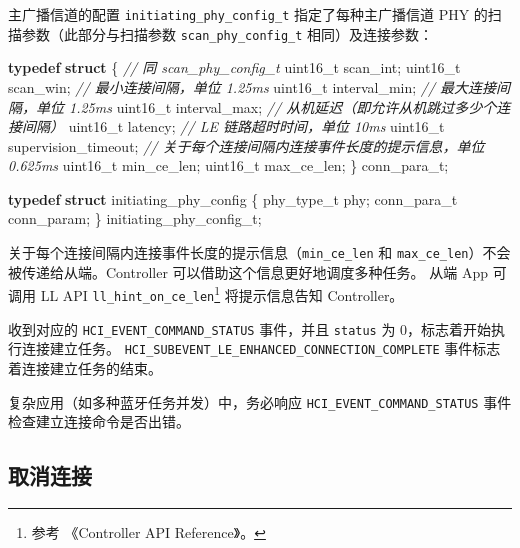 \documentclass[
  12pt,
]{book}
\makeatletter
\newenvironment{Shaded}{\begin{snugshade}}{\end{snugshade}}
\newcommand{\CommentTok}[1]{\textcolor[rgb]{0.56,0.35,0.01}{\textit{#1}}}
\newcommand{\DataTypeTok}[1]{\textcolor[rgb]{0.13,0.29,0.53}{#1}}
\newcommand{\KeywordTok}[1]{\textcolor[rgb]{0.13,0.29,0.53}{\textbf{#1}}}
\newcommand{\NormalTok}[1]{#1}
\newenvironment{kframe}{%
\medskip{}
\setlength{\fboxsep}{.8em}
 \def\at@end@of@kframe{}%
 \ifinner\ifhmode%
  \def\at@end@of@kframe{\end{minipage}}%
  \begin{minipage}{\columnwidth}%
 \fi\fi%
 \def\FrameCommand##1{\hskip\@totalleftmargin \hskip-\fboxsep
 \colorbox{shadecolor}{##1}\hskip-\fboxsep
     \hskip-\linewidth \hskip-\@totalleftmargin \hskip\columnwidth}%
 \MakeFramed {\advance\hsize-\width
   \@totalleftmargin\z@ \linewidth\hsize
   \@setminipage}}%
 {\par\unskip\endMakeFramed%
 \at@end@of@kframe}
\newenvironment{rmdblock}[1]
  {
  \begin{itemize}
  \renewcommand{\labelitemi}{
    \raisebox{-.7\height}[0pt][0pt]{
      {\setkeys{Gin}{width=3em,keepaspectratio}\texttt{[image: images/\#1]}}
    }
  }
  \setlength{\fboxsep}{1em}
  \begin{kframe}
  \item
  }
  {
  \end{kframe}
  \end{itemize}
  }
\newenvironment{rmdcaution}
  {\begin{rmdblock}{caution}}
  {\end{rmdblock}}
\makeatother
\begin{document}
主广播信道的配置 \texttt{initiating\_phy\_config\_t} 指定了每种主广播信道 PHY 的扫描参数（此部分与扫描参数 \texttt{scan\_phy\_config\_t} 相同）及连接参数：

\begin{Shaded}
\begin{Highlighting}[]
\KeywordTok{typedef} \KeywordTok{struct}\NormalTok{ \{}
    \CommentTok{// 同 scan_phy_config_t}
    \DataTypeTok{uint16_t}\NormalTok{ scan_int;}
    \DataTypeTok{uint16_t}\NormalTok{ scan_win;}
    \CommentTok{// 最小连接间隔，单位 1.25ms}
    \DataTypeTok{uint16_t}\NormalTok{ interval_min;}
    \CommentTok{// 最大连接间隔，单位 1.25ms}
    \DataTypeTok{uint16_t}\NormalTok{ interval_max;}
    \CommentTok{// 从机延迟（即允许从机跳过多少个连接间隔）}
    \DataTypeTok{uint16_t}\NormalTok{ latency;}
    \CommentTok{// LE 链路超时时间，单位 10ms}
    \DataTypeTok{uint16_t}\NormalTok{ supervision_timeout;}
    \CommentTok{// 关于每个连接间隔内连接事件长度的提示信息，单位 0.625ms}
    \DataTypeTok{uint16_t}\NormalTok{ min_ce_len;}
    \DataTypeTok{uint16_t}\NormalTok{ max_ce_len;}
\NormalTok{\} conn_para_t;}

\KeywordTok{typedef} \KeywordTok{struct}\NormalTok{ initiating_phy_config}
\NormalTok{\{}
\NormalTok{    phy_type_t phy;}
\NormalTok{    conn_para_t conn_param;}
\NormalTok{\} initiating_phy_config_t;}
\end{Highlighting}
\end{Shaded}

关于每个连接间隔内连接事件长度的提示信息（\texttt{min\_ce\_len} 和 \texttt{max\_ce\_len}）不会被传递给从端。Controller 可以借助这个信息更好地调度多种任务。
从端 App 可调用 LL API \texttt{ll\_hint\_on\_ce\_len}\footnote{参考 《Controller API Reference》。} 将提示信息告知 Controller。

收到对应的 \texttt{HCI\_EVENT\_COMMAND\_STATUS} 事件，并且 \texttt{status} 为 \(0\)，标志着开始执行连接建立任务。
\texttt{HCI\_SUBEVENT\_LE\_ENHANCED\_CONNECTION\_COMPLETE} 事件标志着连接建立任务的结束。

\begin{rmdcaution}
复杂应用（如多种蓝牙任务并发）中，务必响应
\texttt{HCI\_EVENT\_COMMAND\_STATUS} 事件检查建立连接命令是否出错。
\end{rmdcaution}

\hypertarget{ux53d6ux6d88ux8fdeux63a5}{%
\subsection{取消连接}\label{ux53d6ux6d88ux8fdeux63a5}}
\end{document}
